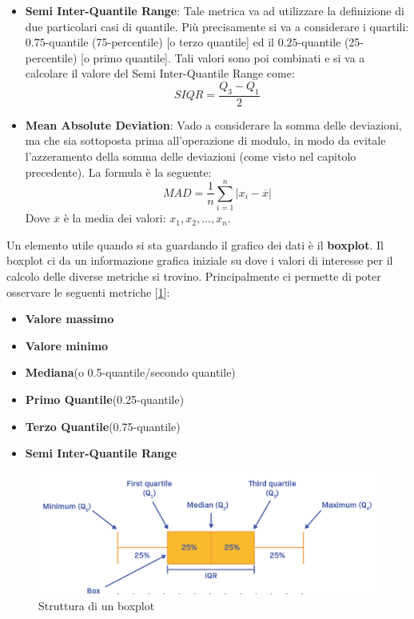 \begin{itemize}
\item \textbf{Semi Inter-Quantile Range}: Tale metrica va ad utilizzare la definizione di due particolari casi di quantile. Più precisamente si va a considerare i quartili: \(0.75\)-quantile (75-percentile) [o terzo quantile] ed il \(0.25\)-quantile (25-percentile) [o primo quantile]. Tali valori sono poi combinati e si va a calcolare il valore del Semi Inter-Quantile Range come:
\[
SIQR = \frac{Q_3 - Q_1}{2}
\]

\item \textbf{Mean Absolute Deviation}: Vado a considerare la somma delle deviazioni, ma che sia sottoposta prima all'operazione di modulo, in modo da evitale l'azzeramento della somma delle deviazioni (come visto nel capitolo precedente). La formula è la seguente:
\[
MAD = \frac{1}{n}\sum_{i=1}^{n}|x_i - \overline{x}|
\]
Dove \(\overline{x}\) è la media dei valori: \(x_1,x_2, \dots, x_n\).

\end{itemize}

Un elemento utile quando si sta guardando il grafico dei dati è il \textbf{boxplot}. Il boxplot ci da un informazione grafica iniziale su dove i valori di interesse per il calcolo delle diverse metriche si trovino. Principalmente ci permette di poter osservare le seguenti metriche [\ref{img:boxplot}]:
\begin{itemize}
    \item \textbf{Valore massimo}
    \item \textbf{Valore minimo}
    \item \textbf{Mediana}(o 0.5-quantile/secondo quantile)
    \item \textbf{Primo Quantile}(0.25-quantile)
    \item \textbf{Terzo Quantile}(0.75-quantile)
    \item \textbf{Semi Inter-Quantile Range}
\end{itemize}

\begin{figure}[H]
\centering
\includegraphics[width=.7\textwidth]{img/chapter-4/boxplot.png}
\caption{Struttura di un boxplot}\label{img:boxplot}
\end{figure}

